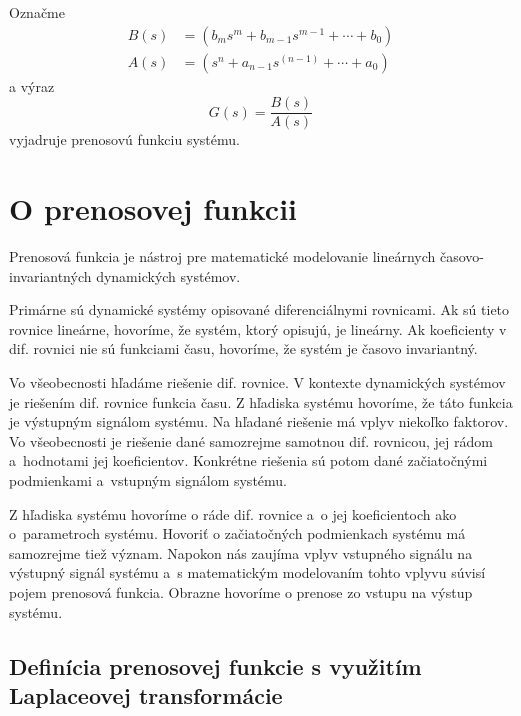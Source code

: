 \documentclass[a4paper, 10pt, ]{article}
\begin{document}
Označme
\begin{subequations}
	\begin{align}
		B(s) &= \left( b_m   s^m + b_{m-1}   s^{m-1} + \cdots + b_0 \right) \\
		A(s) &=  \left( s^n + a_{n-1}   s^{(n-1)} + \cdots + a_0 \right)
	\end{align}
\end{subequations}
a výraz
\begin{equation}
	G(s) = \frac{B(s)}{A(s)}
\end{equation}
vyjadruje prenosovú funkciu systému.







\section{O prenosovej funkcii}


Prenosová funkcia je nástroj pre matematické modelovanie lineárnych časovo-invariantných dynamických systémov.

Primárne sú dynamické systémy opisované diferenciálnymi rovnicami. Ak sú tieto rovnice lineárne, hovoríme, že systém, ktorý opisujú, je lineárny. Ak koeficienty v dif. rovnici nie sú funkciami času, hovoríme, že systém je časovo invariantný.

Vo všeobecnosti hľadáme riešenie dif. rovnice. V kontexte dynamických systémov je riešením dif. rovnice funkcia času. Z hľadiska systému hovoríme, že táto funkcia je výstupným signálom systému. Na hľadané riešenie má vplyv niekoľko faktorov. Vo všeobecnosti je riešenie dané samozrejme samotnou dif. rovnicou, jej rádom a~hodnotami jej koeficientov. Konkrétne riešenia sú potom dané začiatočnými podmienkami a~vstupným signálom systému.

Z hľadiska systému hovoríme o ráde dif. rovnice a~o jej koeficientoch ako o~parametroch systému. Hovoriť o začiatočných podmienkach systému má samozrejme tiež význam. Napokon nás zaujíma vplyv vstupného signálu na výstupný signál systému a~s matematickým modelovaním tohto vplyvu súvisí pojem prenosová funkcia. Obrazne hovoríme o prenose zo vstupu na výstup systému.





\subsection{Definícia prenosovej funkcie s využitím Laplaceovej transformácie}
\end{document}
